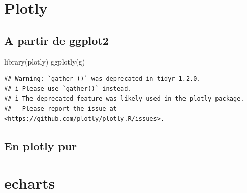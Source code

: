 \documentclass[
]{book}
\newenvironment{Shaded}{\begin{snugshade}}{\end{snugshade}}
\newcommand{\AttributeTok}[1]{\textcolor[rgb]{0.77,0.63,0.00}{#1}}
\newcommand{\FunctionTok}[1]{\textcolor[rgb]{0.00,0.00,0.00}{#1}}
\newcommand{\NormalTok}[1]{#1}
\newcommand{\SpecialCharTok}[1]{\textcolor[rgb]{0.00,0.00,0.00}{#1}}
\newcommand{\StringTok}[1]{\textcolor[rgb]{0.31,0.60,0.02}{#1}}
\begin{document}
\hypertarget{plotly}{%
\section{Plotly}\label{plotly}}

\hypertarget{a-partir-de-ggplot2}{%
\subsection{A partir de ggplot2}\label{a-partir-de-ggplot2}}

\begin{Shaded}
\begin{Highlighting}[]
\FunctionTok{library}\NormalTok{(plotly)}
\FunctionTok{ggplotly}\NormalTok{(g)}
\end{Highlighting}
\end{Shaded}

\begin{verbatim}
## Warning: `gather_()` was deprecated in tidyr 1.2.0.
## i Please use `gather()` instead.
## i The deprecated feature was likely used in the plotly package.
##   Please report the issue at <https://github.com/plotly/plotly.R/issues>.
\end{verbatim}

\hypertarget{en-plotly-pur}{%
\subsection{En plotly pur}\label{en-plotly-pur}}

\begin{Shaded}
\end{Shaded}

\hypertarget{echarts}{%
\section{echarts}\label{echarts}}
\end{document}
